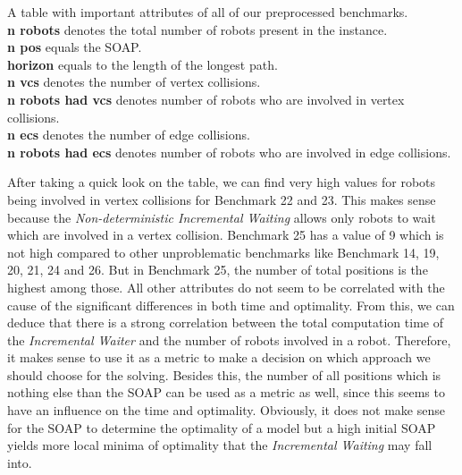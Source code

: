 \documentclass{llncs}
\begin{document}
\begin{table}[]
    \centering
    \vspace{1cm}
    \caption{A table with important attributes of all of our preprocessed benchmarks.\\
    \textbf{n robots} denotes the total number of robots present in the instance.\\
    \textbf{n pos} equals the SOAP.\\
    \textbf{horizon} equals to the length of the longest path.\\
    \textbf{n vcs} denotes the number of vertex collisions.\\
    \textbf{n robots had vcs} denotes number of robots who are involved in vertex collisions.\\
    \textbf{n ecs} denotes the number of edge collisions.\\
    \textbf{n robots had ecs} denotes number of robots who are involved in edge collisions.\\
    }
    \label{tab:tab1}
\end{table}
\newpage
After taking a quick look on the table, we can find very high values for robots being involved in vertex collisions for Benchmark 22 and 23. This makes sense because the \emph{Non-deterministic Incremental Waiting} allows only robots to wait which are involved in a vertex collision. Benchmark 25 has a value of 9 which is not high compared to other unproblematic benchmarks like Benchmark 14, 19, 20, 21, 24 and 26. But in Benchmark 25, the number of total positions is the highest among those. All other attributes do not seem to be correlated with the cause of the significant differences in both time and optimality.
From this, we can deduce that there is a strong correlation between the total computation time of the \emph{Incremental Waiter} and the number of robots involved in a robot. Therefore, it makes sense to use it as a metric to make a decision on which approach we should choose for the solving. Besides this, the number of all positions which is nothing else than the SOAP can be used as a metric as well, since this seems to have an influence on the time and optimality. Obviously, it does not make sense for the SOAP to determine the optimality of a model but a high initial SOAP yields more local minima of optimality that the \emph{Incremental Waiting} may fall into.
\end{document}
